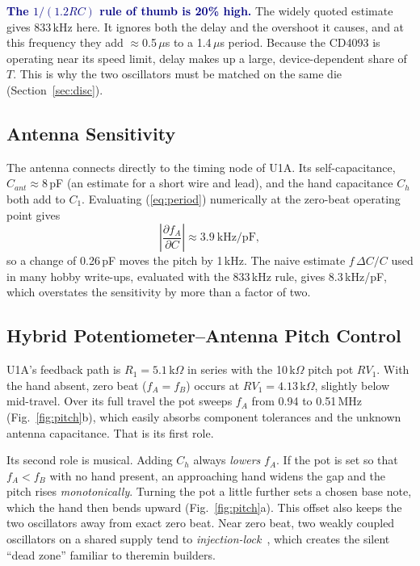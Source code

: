 \documentclass[conference]{IEEEtran}
\newcommand{\novel}[1]{\textcolor{navy}{\textbf{#1}}}
\begin{document}
\novel{The $1/(1.2RC)$ rule of thumb is 20\% high.} The widely quoted estimate gives 833\,kHz here. It ignores both the delay and the overshoot it causes, and at this frequency they add $\approx$0.5\,$\mu$s to a 1.4\,$\mu$s period. Because the CD4093 is operating near its speed limit, delay makes up a large, device-dependent share of $T$. This is why the two oscillators must be matched on the same die (Section~\ref{sec:disc}).

\subsection{Antenna Sensitivity}
The antenna connects directly to the timing node of U1A. Its self-capacitance, $C_{ant}\approx8$\,pF (an estimate for a short wire and lead), and the hand capacitance $C_h$ both add to $C_1$. Evaluating (\ref{eq:period}) numerically at the zero-beat operating point gives
\begin{equation}
\left|\frac{\partial f_A}{\partial C}\right| \approx 3.9\ \text{kHz/pF},
\label{eq:sens}
\end{equation}
so a change of 0.26\,pF moves the pitch by 1\,kHz. The naive estimate $f\,\Delta C/C$ used in many hobby write-ups, evaluated with the 833\,kHz rule, gives 8.3\,kHz/pF, which overstates the sensitivity by more than a factor of two.

\subsection{Hybrid Potentiometer--Antenna Pitch Control}
U1A's feedback path is $R_1=5.1$\,k$\Omega$ in series with the 10\,k$\Omega$ pitch pot $RV_1$. With the hand absent, zero beat ($f_A=f_B$) occurs at $RV_1=4.13$\,k$\Omega$, slightly below mid-travel. Over its full travel the pot sweeps $f_A$ from 0.94 to 0.51\,MHz (Fig.~\ref{fig:pitch}b), which easily absorbs component tolerances and the unknown antenna capacitance. That is its first role.

Its second role is musical. Adding $C_h$ always \emph{lowers} $f_A$. If the pot is set so that $f_A<f_B$ with no hand present, an approaching hand widens the gap and the pitch rises \emph{monotonically}. Turning the pot a little further sets a chosen base note, which the hand then bends upward (Fig.~\ref{fig:pitch}a). This offset also keeps the two oscillators away from exact zero beat. Near zero beat, two weakly coupled oscillators on a shared supply tend to \emph{injection-lock}~\cite{adler1946}, which creates the silent ``dead zone'' familiar to theremin builders.
\end{document}
